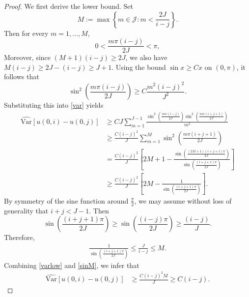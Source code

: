 \documentclass[12pt]{amsart}
\numberwithin{equation}{section}
\newcommand{\1}{\mathbf{1}}
\begin{document}
\begin{proof}
We first derive the lower bound. Set
\begin{equation*}
    M:=\max\left\lbrace m\in\mathcal{J}:m<\frac{2J}{i-j}\right\rbrace.
\end{equation*}
Then for every $m=1,\dots,M$,
\begin{equation*}
    0<\frac{m\pi(i-j)}{2J}<\pi,
\end{equation*}
Moreover, since $(M+1)(i-j)\ge 2J$, we also have $M(i-j)\geq 2J-(i-j)\geq J+1$. Using the bound $\sin x\ge Cx$ on $(0,\pi)$, it follows that
\begin{equation*}
    \sin^2\left(\frac{m\pi(i-j)}{2J}\right)\geq C\frac{m^2(i-j)^2}{J^2}.
\end{equation*}
Substituting this into \eqref{var} yields
\begin{equation}
    \begin{split}
    \label{varlow}
    \widehat{\text{Var}}[u(0,i)-u(0,j)]&\geq CJ\sum_{m=1}^{J-1}\frac{\sin^2\left(\frac{m\pi(i-j)}{2J}\right)\sin^2\left(\frac{m\pi(i+j+1)}{2J}\right)}{m^2}\\
        &\geq \frac{C(i-j)^2}{J}\sum_{m=1}^{M}\sin^2\left(\frac{m\pi(i+j+1)}{2J}\right)\\
        &= \frac{C(i-j)^2}{J}\left[2M+1-\frac{\sin\left(\frac{(2M+1)(i+j+1)\pi}{2J}\right)}{\sin\left(\frac{(i+j+1)\pi}{2J}\right)}\right]\\
        &\geq \frac{C(i-j)^2}{J}\left[2M-\frac{1}{\sin\left(\frac{(i+j+1)\pi}{2J}\right)}\right].
    \end{split}
\end{equation}
By symmetry of the sine function around $\frac{\pi}{2}$, we may assume without loss of generality that $i+j<J-1$. Then
\begin{equation*}
    \sin\left(\frac{(i+j+1)\pi}{2J}\right)\geq\sin\left(\frac{(i-j)\pi}{2J}\right)\geq\frac{(i-j)}{J}.
\end{equation*}
Therefore,
\begin{equation}
\begin{split}
\label{sinM}
    \frac{1}{\sin\left(\frac{(i+j+1)\pi}{2J}\right)}\leq\frac{J}{i-j}\leq M.
\end{split}
\end{equation}
Combining \eqref{varlow} and \eqref{sinM}, we infer that
\begin{equation*}
    \begin{split}
        \widehat{\text{Var}}[u(0,i)-u(0,j)]&\geq \frac{C(i-j)^2M}{J}\geq C(i-j).
    \end{split}
\end{equation*}


\end{proof}
\end{document}
